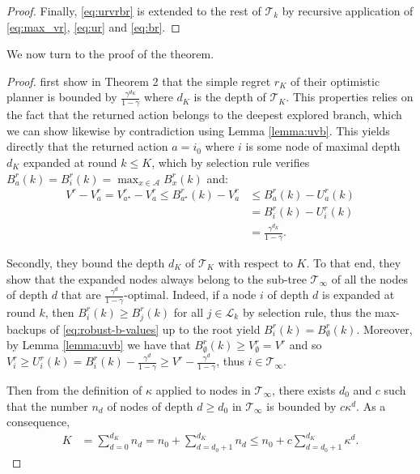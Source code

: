 \begin{subappendices}
\begin{proof}
		Finally, \eqref{eq:urvrbr} is extended to the rest of $\mathcal{T}_k$ by recursive application of \eqref{eq:max_vr}, \eqref{eq:ur} and \eqref{eq:br}.
	\end{proof}
	
	We now turn to the proof of the theorem.
	
	\begin{proof}
		\citet{Hren2008} first show in Theorem 2 that the simple regret $r_K$ of their optimistic planner is bounded by $\frac{\gamma^{d_K}}{1 - \gamma}$ where $d_K$ is the depth of $\mathcal{T}_K$. This properties relies on the fact that the returned action belongs to the deepest explored branch, which we can show likewise by contradiction using Lemma \ref{lemma:uvb}. This yields directly that the returned action $a = i_0$ where $i$ is some node of maximal depth $d_K$ expanded at round $k\leq K$, which by selection rule verifies $B_a^r(k) = B_i^r(k) = \max_{x\in\mathcal{A}} B_x^r(k)$ and:
		\begin{align*}
		\label{eq:Rndn}
		V^r - V_a^r = V_{a^{\star}}^r - V_a^r  \leq B_{a^{\star}}^r(k) - V_a^r &\leq B_{a}^r(k) - U_a^r(k) \\
		&= B_{i}^r(k) - U_i^r(k) \\
		&= \frac{\gamma^{d_K}}{1-\gamma}.
		\end{align*}
		
		Secondly, they bound the depth $d_K$ of $\mathcal{T}_K$ with respect to $K$. To that end, they show that the expanded nodes always belong to the sub-tree $\mathcal{T}_\infty$ of all the nodes of depth $d$ that are $\frac{\gamma^d}{1-\gamma}$-optimal. Indeed, if a node $i$ of depth $d$ is expanded at round $k$, then $B_i^r(k) \geq B_j^r(k)$ for all $j\in \mathcal{L}_k$ by selection rule, thus the max-backups of \eqref{eq:robust-b-values} up to the root yield $B^r_i(k) = B_\emptyset^r(k)$. Moreover, by Lemma \ref{lemma:uvb} we have that $B_\emptyset^r(k) \geq V_\emptyset^r = V^r$ and so $V_i^r \geq U_i^r(k) = B_i^r(k) - \frac{\gamma^d}{1-\gamma} \geq V^r - \frac{\gamma^d}{1-\gamma}$, thus $i \in \mathcal{T}_\infty$.
		
		Then from the definition of $\kappa$ applied to nodes in $\mathcal{T}_\infty$, there exists $d_0$ and $c$ such that the number $n_d$ of nodes of depth $d \geq d_0$ in $\mathcal{T}_\infty$ is bounded by $c\kappa^d$. As a consequence, 
		\begin{eqnarray*}
			K &= \sum_{d=0}^{d_K} n_d = n_0 + \sum_{d=d_0+1}^{d_K} n_d \leq n_0 + c\sum_{d={d_0+1}}^{d_K} \kappa^d.
		\end{eqnarray*}
		

\end{proof}
\end{subappendices}
